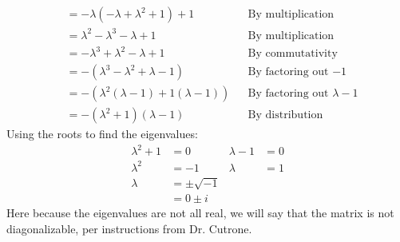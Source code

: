 \documentclass[10pt,letterpaper,final]{report}
\newcommand{\reason}[1]{&& \text{#1}}
\begin{document}
\begin{enumerate}[label=(\alph*)]
\begin{align*}
                              & = -\lambda(-\lambda + \lambda^2 + 1) + 1 \reason{By multiplication}                                                                                                          \\[1ex]
                              & = \lambda^2 - \lambda^3 - \lambda + 1 \reason{By multiplication}                                                                                                             \\[1ex]
                              & = -\lambda^3 + \lambda^2 - \lambda + 1 \reason{By commutativity}                                                                                                             \\[1ex]
                              & = -(\lambda^3 - \lambda^2 + \lambda - 1) \reason{By factoring out $-1$}                                                                                                      \\[1ex]
                              & = -(\lambda^2(\lambda - 1) + 1(\lambda - 1)) \reason{By factoring out $\lambda - 1$}                                                                                         \\[1ex]
                              & = -(\lambda^2 + 1)(\lambda - 1) \reason{By distribution}
        \end{align*}
        Using the roots to find the eigenvalues:
        \begin{align*}
          \lambda^2 + 1 & = 0            & \lambda - 1 & = 0 \\
          \lambda^2     & = -1           & \lambda     & = 1 \\
          \lambda       & = \pm\sqrt{-1} &             &     \\
                        & = 0 \pm i      &             &
        \end{align*}
        Here because the eigenvalues are not all real, we will say that the matrix is not diagonalizable, per instructions from Dr. Cutrone.


\end{enumerate}
\end{document}
